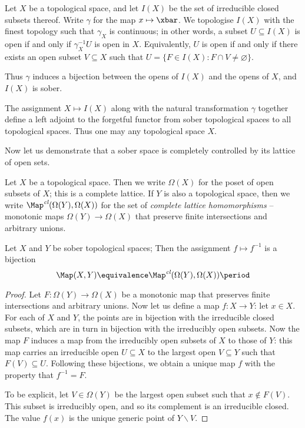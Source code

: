 \begin{cnstr}
	Let $ X $ be a topological space, and let $ I(X) $ be the set of irreducible closed subsets thereof.
	Write $ \gamma $ for the map $ x \mapsto \xbar $.
	We topologise $ I(X) $ with the finest topology such that $ \gamma_X $ is continuous;
	in other words, a subset $U \subseteq I(X) $ is open if and only if $ \gamma_X^{-1} U $ is open in $ X $.
	Equivalently, $ U $ is open if and only if there exists an open subset $ V \subseteq X $ such that $ U = \{ F \in I(X) : F \cap V \neq \varnothing \} $.

	Thus $ \gamma $ induces a bijection between the opens of $ I(X) $ and the opens of $ X $, and $ I(X) $ is sober.
	
	The assignment $ X \mapsto I(X) $ along with the natural transformation $ \gamma $ together define a left adjoint to the forgetful functor from sober topological spaces to all topological spaces.
	Thus one may  any topological space $ X $.
\end{cnstr}

Now let us demonstrate that a sober space is completely controlled by its lattice of open sets.

\begin{ntn}
	Let $ X $ be a topological space.
	Then we write $ \Omega(X) $ for the poset of open subsets of $ X $;
	this is a complete lattice.
	If $ Y $ is also a topological space, then we write $ \Map^{\textit{cl}}(\Omega(Y), \Omega(X)) $ for the set of \emph{complete lattice homomorphisms} -- monotonic maps $ \Omega(Y) \to \Omega(X) $ that preserve finite intersections and arbitrary unions.
\end{ntn}

\begin{prp}
	Let $ X $ and $ Y $ be sober topological spaces;
	Then the assignment $ f \mapsto f^{-1} $ is a bijection
	\[
		\Map(X, Y) \equivalence \Map^{\textit{cl}}(\Omega(Y), \Omega(X)) \period
	\]
\end{prp}

\begin{proof}
	Let $ F \colon \Omega(Y) \to \Omega(X) $ be a monotonic map that preserves finite intersections and arbitrary unions.
	Now let us define a map $ f \colon X \to Y $: let $ x \in X $.
	For each of $ X $ and $ Y $, the points are in bijection with the irreducible closed subsets, which are in turn in bijection with the irreducibly open subsets.
	Now the map $ F $ induces a map from the irreducibly open subsets of $ X $ to those of $ Y $:
	this map carries an irreducible open $ U \subseteq X $ to the largest open $ V \subseteq Y $ such that $ F(V) \subseteq U $.
	Following these bijections, we obtain a unique map $ f $ with the property that $ f^{-1} = F $.
	
	To be explicit, let $ V \in \Omega(Y) $ be the largest open subset such that $ x \notin F(V) $.
	This subset is irreducibly open, and so its complement is an irreducible closed.
	The value $ f(x) $ is the unique generic point of $ Y \smallsetminus V $.
\end{proof}


